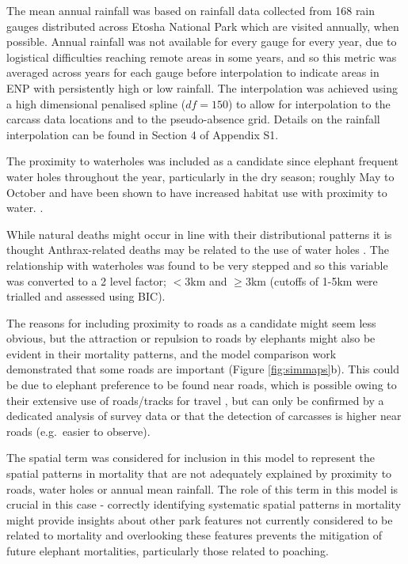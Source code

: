 \documentclass[letterpaper, 12pt]{interact}
\begin{document}
	The mean annual rainfall was based on rainfall data collected from 168 rain gauges distributed across Etosha National Park which are visited annually, when possible. Annual rainfall was not available for every gauge for every year, due to logistical difficulties reaching remote areas in some years, and so this metric was averaged across years for each gauge before interpolation to indicate areas in ENP with persistently high or low rainfall. The interpolation was achieved using a high dimensional penalised spline (\(df=150\)) to allow for interpolation to the carcass data locations and to the pseudo-absence grid. Details on the rainfall interpolation can be found in Section 4 of Appendix S1.
	
	The proximity to waterholes was included as a candidate since elephant frequent water holes throughout the year, particularly in the dry season; roughly May to October \cite{Tsalyuk2019} and have been shown to have increased habitat use with proximity to water. \cite{Harris2008}.
	
	While natural deaths might occur in line with their distributional patterns it is thought Anthrax-related deaths may be related to the use of water holes \cite{zidon2017}. The relationship with waterholes was found to be very stepped and so this variable was converted to a 2 level factor; $<3$km and $\geq 3$km (cutoffs of 1-5km were trialled and assessed using BIC).
	
	The reasons for including proximity to roads as a candidate might seem less obvious, but the attraction or repulsion to roads by elephants might also be evident in their mortality patterns, and the model comparison work demonstrated that some roads are important (Figure \ref{fig:simmaps}b). This could be due to elephant preference to be found near roads, which is possible owing to their extensive use of roads/tracks for travel \cite{Tsalyuk2019}, but can only be confirmed by a dedicated analysis of survey data or that the detection of carcasses is higher near roads (e.g.~easier to observe).
	
	The spatial term was considered for inclusion in this model to represent the spatial patterns in mortality that are not adequately explained by proximity to roads, water holes or annual mean rainfall. The role of this term in this model is crucial in this case - correctly identifying systematic spatial patterns in mortality might provide insights about other park features not currently considered to be related to mortality and overlooking these features prevents the mitigation of future elephant mortalities, particularly those related to poaching.
	
\end{document}
